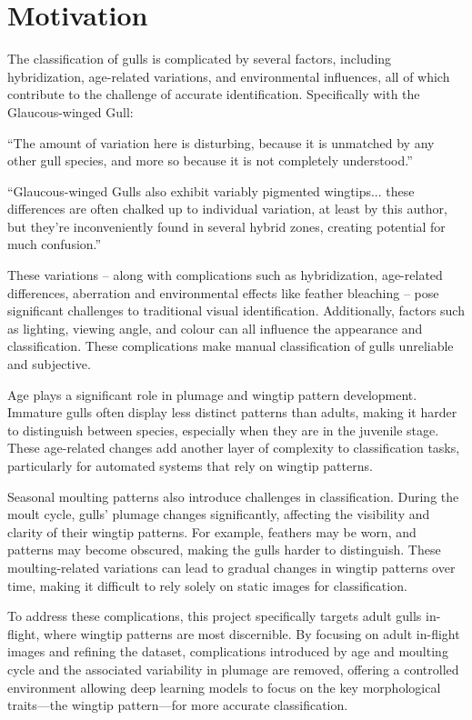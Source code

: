 
\chapter{Motivation}

The classification of gulls is complicated by several factors, including hybridization, age-related variations, and environmental influences, all of which contribute to the challenge of accurate identification. Specifically with the Glaucous-winged Gull:

``The amount of variation here is disturbing, because it is unmatched by any other gull species, and more so because it is not completely understood.'' \citep{gull_variation}

``Glaucous-winged Gulls also exhibit variably pigmented wingtips... these differences are often chalked up to individual variation, at least by this author, but they're inconveniently found in several hybrid zones, creating potential for much confusion.'' \citep{gull_variation}

These variations – along with complications such as hybridization, age-related differences, aberration and environmental effects like feather bleaching – pose significant challenges to traditional visual identification. Additionally, factors such as lighting, viewing angle, and colour can all influence the appearance and classification. These complications make manual classification of gulls unreliable and subjective. \citep{gull_variation}

Age plays a significant role in plumage and wingtip pattern development. Immature gulls often display less distinct patterns than adults, making it harder to distinguish between species, especially when they are in the juvenile stage. These age-related changes add another layer of complexity to classification tasks, particularly for automated systems that rely on wingtip patterns. \citep{gull_variation}

Seasonal moulting patterns also introduce challenges in classification. During the moult cycle, gulls' plumage changes significantly, affecting the visibility and clarity of their wingtip patterns. For example, feathers may be worn, and patterns may become obscured, making the gulls harder to distinguish. These moulting-related variations can lead to gradual changes in wingtip patterns over time, making it difficult to rely solely on static images for classification.

To address these complications, this project specifically targets adult gulls in-flight, where wingtip patterns are most discernible. By focusing on adult in-flight images and refining the dataset, complications introduced by age and moulting cycle and the associated variability in plumage are removed, offering a controlled environment allowing deep learning models to focus on the key morphological traits—the wingtip pattern—for more accurate classification.

